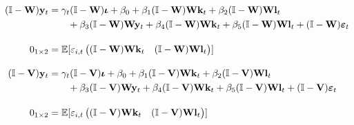 \begin{align}
    \label{eq:ext-lnfe-reduced}
    (\mathbb I-\mathbf W)\mathbf y_{t} &=
                        \gamma_t (\mathbb I-\mathbf W)\boldsymbol\iota
                    + \beta_0
                    + \beta_1 (\mathbb I-\mathbf W)\mathbf W \mathbf k_{t}
                    + \beta_2 (\mathbb I-\mathbf W)\mathbf W \mathbf l_{t}
                    \\&\qquad \notag
                    + \beta_3 (\mathbb I-\mathbf W)\mathbf W \mathbf y_{t}
                    + \beta_4 (\mathbb I-\mathbf W)\mathbf W \mathbf k_{t}
                    + \beta_5 (\mathbb I-\mathbf W)\mathbf W \mathbf l_{t}
                    + (\mathbb I-\mathbf W) \boldsymbol \varepsilon_{t}
    \\[1em] \notag
    0_{1\times 2} &= \mathbb E[
        \varepsilon_{i,t}
        \begin{pmatrix}
            (\mathbb I-\mathbf W)\mathbf W \mathbf k_t &
            (\mathbb I-\mathbf W)\mathbf W \mathbf l_t
        \end{pmatrix}
    ]
    \\[1em]
    \label{eq:ext-gnfe-reduced}
    (\mathbb I-\mathbf V) \mathbf y_{t} &=
                      \gamma_t (\mathbb I-\mathbf V)\boldsymbol\iota
                    + \beta_0
                    + \beta_1 (\mathbb I-\mathbf V)\mathbf W \mathbf k_{t}
                    + \beta_2 (\mathbb I-\mathbf V)\mathbf W \mathbf l_{t}
                    \\&\qquad \notag
                    + \beta_3 (\mathbb I-\mathbf V)\mathbf W \mathbf y_{t}
                    + \beta_4 (\mathbb I-\mathbf V)\mathbf W \mathbf k_{t}
                    + \beta_5 (\mathbb I-\mathbf V)\mathbf W \mathbf l_{t}
                    + (\mathbb I-\mathbf V) \boldsymbol \varepsilon_{t}
    \\[1em] \notag
    0_{1\times 2} &= \mathbb E[
        \varepsilon_{i,t}
        \begin{pmatrix}
            (\mathbb I-\mathbf V)\mathbf W \mathbf k_t &
            (\mathbb I-\mathbf V)\mathbf W \mathbf l_t
        \end{pmatrix}
    ]
\end{align}


